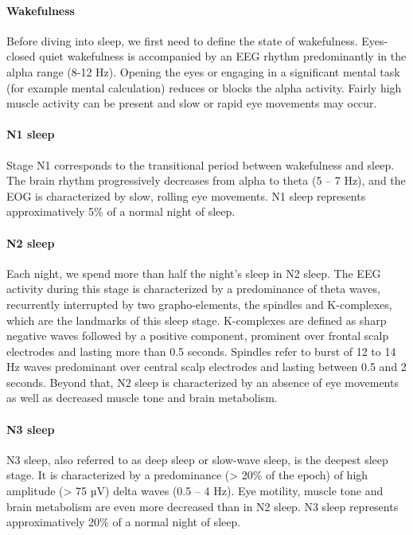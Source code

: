 \paragraph{Wakefulness}
Before diving into sleep, we first need to define the state of wakefulness. Eyes-closed quiet wakefulness is accompanied by an EEG rhythm predominantly in the alpha range (8-12 Hz). Opening the eyes or engaging in a significant mental task (for example mental calculation) reduces or blocks the alpha activity. Fairly high muscle activity can be present and slow or rapid eye movements may occur.

\paragraph{N1 sleep}
Stage N1 corresponds to the transitional period between wakefulness and sleep. The brain rhythm progressively decreases from alpha to theta (5 – 7 Hz), and the EOG is characterized by slow, rolling eye movements. N1 sleep represents approximatively 5\% of a normal night of sleep.

\paragraph{N2 sleep}
Each night, we spend more than half the night’s sleep in N2 sleep. The EEG activity during this stage is characterized by a predominance of theta waves, recurrently interrupted by two grapho-elements, the spindles and K-complexes, which are the landmarks of this sleep stage. K-complexes are defined as sharp negative waves followed by a positive component, prominent over frontal scalp electrodes and lasting more than 0.5 seconds. Spindles refer to burst of 12 to 14 Hz waves predominant over central scalp electrodes and lasting between 0.5 and 2 seconds. Beyond that, N2 sleep is characterized by an absence of eye movements as well as decreased muscle tone and brain metabolism.

\paragraph{N3 sleep}
N3 sleep, also referred to as deep sleep or slow-wave sleep, is the deepest sleep stage. It is characterized by a predominance (> 20\% of the epoch) of high amplitude (> 75 µV) delta waves (0.5 – 4 Hz). Eye motility, muscle tone and brain metabolism are even more decreased than in N2 sleep. N3 sleep represents approximatively 20\% of a normal night of sleep.

